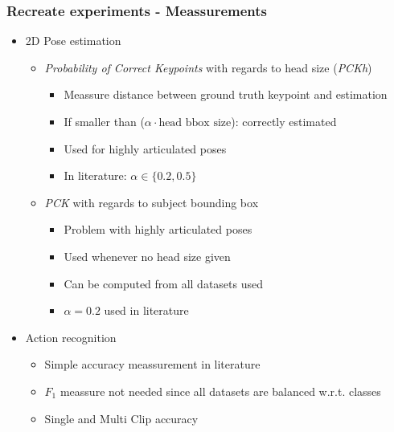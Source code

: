 \documentclass[9pt]{beamer}
\newenvironment{myframe}[1][]{%
\begin{frame}%
\frametitle{#1}
\setcounter{footnote}{0}


}{%
\end{frame}%
}
\begin{document}
\begin{myframe}[Recreate experiments - Meassurements]
    \begin{itemize}
        \item 2D Pose estimation
        \begin{itemize}
            \item \textit{Probability of Correct Keypoints} with regards to head size (\textit{PCKh})
            \begin{itemize}
                \item Meassure distance between ground truth keypoint and estimation
                \item If smaller than ($\alpha \cdot \text{head bbox size}$): correctly estimated
                \item Used for highly articulated poses
                \item In literature: $\alpha \in \{0.2, 0.5\}$
            \end{itemize}    
            \item \textit{PCK} with regards to subject bounding box
            \begin{itemize}
                \item Problem with highly articulated poses
                \item Used whenever no head size given
                \item Can be computed from all datasets used
                \item $\alpha = 0.2$ used in literature
            \end{itemize}
        \end{itemize}
        \item Action recognition
        \begin{itemize}
            \item Simple accuracy meassurement in literature
            \item $F_1$ meassure not needed since all datasets are balanced w.r.t. classes
            \item Single and Multi Clip accuracy
        \end{itemize}
    \end{itemize}
\end{myframe}
\end{document}
